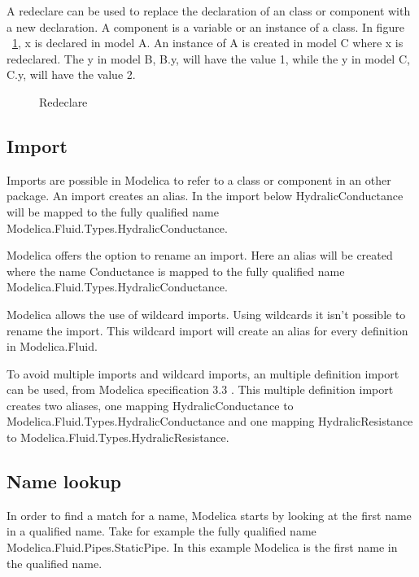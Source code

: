 \documentclass{cslthse-msc}
\begin{document}
A redeclare can be used to replace the declaration of an class or component with a new declaration. A component is a variable or an instance of a class. In figure ~\ref{fig:redeclare}, x is declared in model A. An instance of A is created in model C where x is redeclared. The y in model B, B.y, will have the value 1, while the y in model C, C.y, will have the value 2.

\begin{figure}[H]
	
    \caption{Redeclare}
    \label{fig:redeclare}
\end{figure}

\subsection{Import}
Imports are possible in Modelica to refer to a class or component in an other package. An import creates an alias. In the import below HydralicConductance will be mapped to the fully qualified name Modelica.Fluid.Types.HydralicConductance.



Modelica offers the option to rename an import. Here an alias will be created where the name Conductance is mapped to the fully qualified name Modelica.Fluid.Types.HydralicConductance.



Modelica allows the use of wildcard imports. Using wildcards it isn't possible to rename the import. This wildcard import will create an alias for every definition in Modelica.Fluid.



To avoid multiple imports and wildcard imports, an multiple definition import can be used, from Modelica specification 3.3 \cite{modelicamodelica}. This multiple definition import creates two aliases, one mapping HydralicConductance to Modelica.Fluid.Types.HydralicConductance and one mapping HydralicResistance to Modelica.Fluid.Types.HydralicResistance.



\subsection{Name lookup}
In order to find a match for a name, Modelica starts by looking at the first name in a qualified name. Take for example the fully qualified name Modelica.Fluid.Pipes.StaticPipe. In this example Modelica is the first name in the qualified name.
\end{document}
